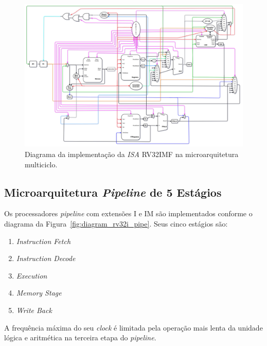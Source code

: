         \begin{figure}[H]
        \centering
            \includegraphics[width=1\linewidth]{../images/uarch_diagrams/multicycle-RV32IMF.png}
            \caption{Diagrama da implementação da \textit{ISA} RV32IMF na
            microarquitetura multiciclo.}\label{fig:diagram_rv32imf_multi}
        \end{figure}


    \subsection{Microarquitetura \textit{Pipeline} de 5 Estágios}
        { Os processadores \textit{pipeline} com extensões I e IM são
            implementados conforme o diagrama da Figura~\ref{fig:diagram_rv32i_pipe}.
            Seus cinco estágios são:
            \begin{enumerate}
                \item \textit{Instruction Fetch}
                \item \textit{Instruction Decode}
                \item \textit{Execution}
                \item \textit{Memory Stage}
                \item \textit{Write Back}
            \end{enumerate}
        }
        { A frequência máxima do seu \textit{clock} é limitada pela operação
            mais lenta da unidade lógica e aritmética na terceira etapa do
            \textit{pipeline}.
        }

